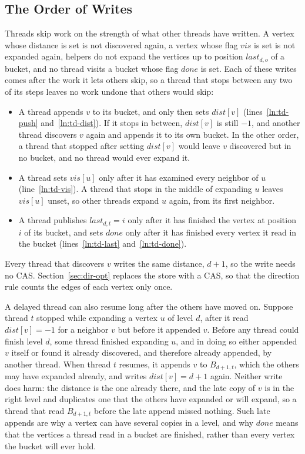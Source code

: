 \subsection{The Order of Writes}
\label{sec:td-order}

Threads skip work on the strength of what other threads have written. A vertex whose distance is set is not discovered again, a vertex whose flag $\mathit{vis}$ is set is not expanded again, helpers do not expand the vertices up to position $\mathit{last}_{d,o}$ of a bucket, and no thread visits a bucket whose flag $\mathit{done}$ is set. Each of these writes comes after the work it lets others skip, so a thread that stops between any two of its steps leaves no work undone that others would skip:
\begin{itemize}
    \item A thread appends $v$ to its bucket, and only then sets $\mathit{dist}[v]$ (lines~\ref{ln:td-push} and~\ref{ln:td-dist}). If it stops in between, $\mathit{dist}[v]$ is still $-1$, and another thread discovers $v$ again and appends it to its own bucket. In the other order, a thread that stopped after setting $\mathit{dist}[v]$ would leave $v$ discovered but in no bucket, and no thread would ever expand it.
    \item A thread sets $\mathit{vis}[u]$ only after it has examined every neighbor of $u$ (line~\ref{ln:td-vis}). A thread that stops in the middle of expanding $u$ leaves $\mathit{vis}[u]$ unset, so other threads expand $u$ again, from its first neighbor.
    \item A thread publishes $\mathit{last}_{d,t} = i$ only after it has finished the vertex at position $i$ of its bucket, and sets $\mathit{done}$ only after it has finished every vertex it read in the bucket (lines~\ref{ln:td-last} and~\ref{ln:td-done}).
\end{itemize}
Every thread that discovers $v$ writes the same distance, $d+1$, so the write needs no CAS. Section~\ref{sec:dir-opt} replaces the store with a CAS, so that the direction rule counts the edges of each vertex only once.

A delayed thread can also resume long after the others have moved on. Suppose thread $t$ stopped while expanding a vertex $u$ of level $d$, after it read $\mathit{dist}[v] = -1$ for a neighbor $v$ but before it appended $v$. Before any thread could finish level $d$, some thread finished expanding $u$, and in doing so either appended $v$ itself or found it already discovered, and therefore already appended, by another thread. When thread $t$ resumes, it appends $v$ to $B_{d+1,t}$, which the others may have expanded already, and writes $\mathit{dist}[v] = d+1$ again. Neither write does harm: the distance is the one already there, and the late copy of $v$ is in the right level and duplicates one that the others have expanded or will expand, so a thread that read $B_{d+1,t}$ before the late append missed nothing. Such late appends are why a vertex can have several copies in a level, and why $\mathit{done}$ means that the vertices a thread read in a bucket are finished, rather than every vertex the bucket will ever hold.

